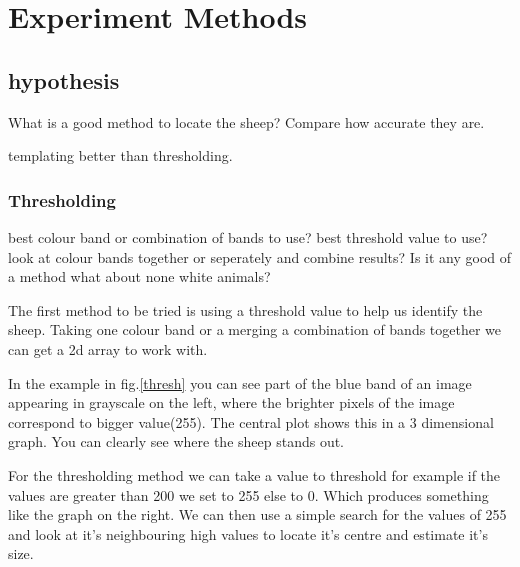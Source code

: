 \chapter{Experiment Methods}
\begin{comment}
This section should discuss the overall hypothesis being tested and justify the approach selected in the context of the research area.  Describe the experiment design that has been selected and how measurements and comparisons of results are to be made. 

You should concentrate on the more important aspects of the method. Present an overview before going into detail. As well as describing the methods adopted, discuss other approaches that were considered. You might also discuss areas that you had to revise after some investigation. 


\end{comment}

\section{hypothesis}

What is a good method to locate the sheep?
Compare how accurate they are.

templating better than thresholding.

\subsection{Thresholding}

best colour band or combination of bands to use?
best threshold value to use?
look at colour bands together or seperately and combine results? Is it any good of a method what about none white animals?

The first method to be tried is using a threshold value to help us identify the sheep\cite{opencv-t}. Taking one colour band or a merging a combination of bands together we can get a 2d array to work with. 
    
In the example in fig.\ref{thresh} you can see part of the blue band of an image appearing in grayscale on the left, where the brighter pixels of the image correspond to bigger value(255). The central plot shows this in a 3 dimensional graph. You can clearly see where the sheep stands out. 
    
For the thresholding method we can take a value to threshold for example if the values are greater than 200 we set to 255 else to 0. Which produces something like the graph on the right. We can then use a simple search for the values of 255 and look at it's neighbouring high values to locate it's centre and estimate it's size.
    
